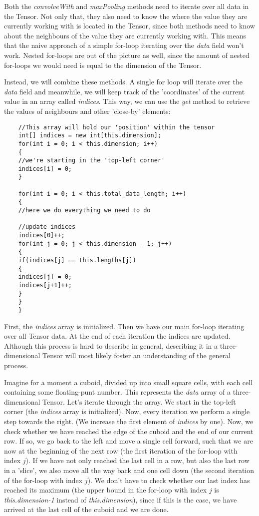 \documentclass[12pt, titlepage]{article}
\begin{document}
    Both the \textit{convolveWith} and \textit{maxPooling} methods need to iterate over all data in the Tensor. Not only that, they also need to know the where the value they are currently working with is located in the Tensor, since both methods need to know about the neighbours of the value they are currently working with. This means that the naive approach of a simple for-loop iterating over the \textit{data} field won't work. Nested for-loops are out of the picture as well, since the amount of nested for-loops we would need is equal to the dimension of the Tensor.
    
    Instead, we will combine these methods. A single for loop will iterate over the \textit{data} field and meanwhile, we will keep track of the 'coordinates' of the current value in an array called \textit{indices}. This way, we can use the \textit{get} method to retrieve the values of neighbours and other 'close-by' elements:
    \begin{lstlisting}
    //This array will hold our 'position' within the tensor
    int[] indices = new int[this.dimension];
    for(int i = 0; i < this.dimension; i++)
    {
    //we're starting in the 'top-left corner'
    indices[i] = 0;
    }
    
    for(int i = 0; i < this.total_data_length; i++)
    {
    //here we do everything we need to do
    
    //update indices
    indices[0]++;
    for(int j = 0; j < this.dimension - 1; j++)
    {
    if(indices[j] == this.lengths[j])
    {
    indices[j] = 0;
    indices[j+1]++;
    }
    }
    }
    \end{lstlisting}
    First, the \textit{indices} array is initialized. Then we have our main for-loop iterating over all Tensor data. At the end of each iteration the indices are updated. Although this process is hard to describe in general, describing it in a three-dimensional Tensor will most likely foster an understanding of the general process.
    
    Imagine for a moment a cuboid, divided up into small square cells, with each cell containing some floating-punt number. This represents the \textit{data} array of a three-dimensional Tensor. Let's iterate through the array. We start in the top-left corner (the \textit{indices} array is initialized). Now, every iteration we perform a single step towards the right. (We increase the first element of \textit{indices} by one). Now, we check whether we have reached the edge of the cuboid and the end of our current row. If so, we go back to the left and move a single cell forward, such that we are now at the beginning of the next row (the first iteration of the for-loop with index $j$). If we have not only reached the last cell in a row, but also the last row in a 'slice', we also move all the way back and one cell down (the second iteration of the for-loop with index $j$). We don't have to check whether our last index has reached its maximum (the upper bound in the for-loop with index $j$ is \textit{this.dimension-1} instead of \textit{this.dimension}), since if this is the case, we have arrived at the last cell of the cuboid and we are done.
    
\end{document}
